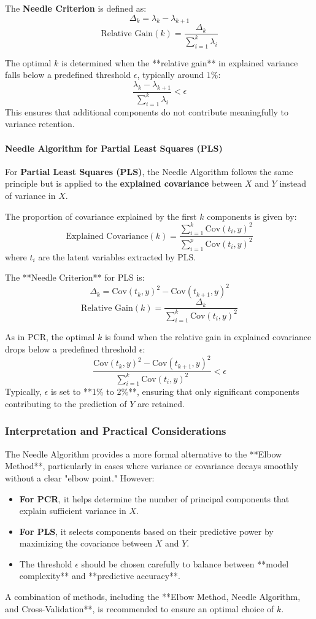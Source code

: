 \documentclass[11pt,twoside,a4paper]{article}
\begin{document}
The \textbf{Needle Criterion} is defined as:
\[
\Delta_k = \lambda_k - \lambda_{k+1}
\]
\[
\text{Relative Gain}(k) = \frac{\Delta_k}{\sum_{i=1}^{k} \lambda_i}
\]

The optimal \( k \) is determined when the **relative gain** in explained variance falls below a predefined threshold \( \epsilon \), typically around \( 1\% \):
\[
\frac{\lambda_k - \lambda_{k+1}}{\sum_{i=1}^{k} \lambda_i} < \epsilon
\]
This ensures that additional components do not contribute meaningfully to variance retention.

\paragraph{Needle Algorithm for Partial Least Squares (PLS)}
For \textbf{Partial Least Squares (PLS)}, the Needle Algorithm follows the same principle but is applied to the \textbf{explained covariance} between \( X \) and \( Y \) instead of variance in \( X \). 

The proportion of covariance explained by the first \( k \) components is given by:
\[
\text{Explained Covariance}(k) = \frac{\sum_{i=1}^{k} \text{Cov}(t_i, y)^2}{\sum_{i=1}^{p} \text{Cov}(t_i, y)^2}
\]
where \( t_i \) are the latent variables extracted by PLS.

The **Needle Criterion** for PLS is:
\[
\Delta_k = \text{Cov}(t_k, y)^2 - \text{Cov}(t_{k+1}, y)^2
\]
\[
\text{Relative Gain}(k) = \frac{\Delta_k}{\sum_{i=1}^{k} \text{Cov}(t_i, y)^2}
\]

As in PCR, the optimal \( k \) is found when the relative gain in explained covariance drops below a predefined threshold \( \epsilon \):
\[
\frac{\text{Cov}(t_k, y)^2 - \text{Cov}(t_{k+1}, y)^2}{\sum_{i=1}^{k} \text{Cov}(t_i, y)^2} < \epsilon
\]
Typically, \( \epsilon \) is set to **1\% to 2\%**, ensuring that only significant components contributing to the prediction of \( Y \) are retained.

\subsubsection{Interpretation and Practical Considerations}
The Needle Algorithm provides a more formal alternative to the **Elbow Method**, particularly in cases where variance or covariance decays smoothly without a clear "elbow point." However:
\begin{itemize}
    \item \textbf{For PCR}, it helps determine the number of principal components that explain sufficient variance in \( X \).
    \item \textbf{For PLS}, it selects components based on their predictive power by maximizing the covariance between \( X \) and \( Y \).
    \item The threshold \( \epsilon \) should be chosen carefully to balance between **model complexity** and **predictive accuracy**.
\end{itemize}
A combination of methods, including the **Elbow Method, Needle Algorithm, and Cross-Validation**, is recommended to ensure an optimal choice of \( k \).
\end{document}
